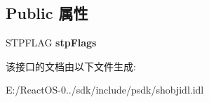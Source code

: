 \subsection*{Public 属性}
\begin{DoxyCompactItemize}
\item 
\mbox{\label{interface_i_taskbar_list4_a5dbd7367359ed6f05c6ae22bc17e0e5b}} 
S\+T\+P\+F\+L\+AG {\bfseries stp\+Flags}
\end{DoxyCompactItemize}


该接口的文档由以下文件生成\+:\begin{DoxyCompactItemize}
\item 
E\+:/\+React\+O\+S-\/0../sdk/include/psdk/shobjidl.\+idl\end{DoxyCompactItemize}

